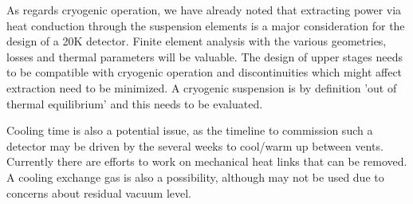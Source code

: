 As regards cryogenic operation, we have already noted that extracting power via heat conduction through the suspension elements is a major consideration for the design of a 20K detector. Finite element analysis with the various geometries, losses and thermal parameters will be valuable. The design of upper stages needs to be compatible with cryogenic operation and discontinuities which might affect extraction need to be minimized. A cryogenic suspension is by definition 'out of thermal equilibrium' and this needs to be evaluated.

Cooling time is also a potential issue, as the timeline to commission such a detector may be driven by the several weeks to cool/warm up between vents. Currently there are efforts to work on mechanical heat links that can be removed. A cooling exchange gas is also a possibility, although may not be used due to concerns about residual vacuum level.

